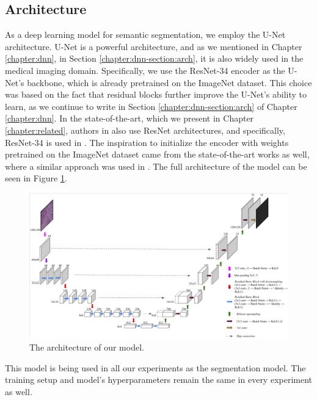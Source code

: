 \subsection{Architecture}
As a deep learning model for semantic segmentation, we employ the U-Net architecture. U-Net is a powerful architecture, and as we mentioned in Chapter \ref{chapter:dnn}, in Section \ref{chapter:dnn-section:arch}, it is also widely used in the medical imaging domain. Specifically, we use the ResNet-34 encoder as the U-Net's backbone, which is already pretrained on the ImageNet dataset. This choice was based on the fact that residual blocks further improve the U-Net's ability to learn, as we continue to write in Section \ref{chapter:dnn-section:arch} of Chapter \ref{chapter:dnn}. In the state-of-the-art, which we present in Chapter \ref{chapter:related}, authors in \cite{Zhang2022, Liang2023} also use ResNet architectures, and specifically, ResNet-34 is used in \cite{Lin2023}. The inspiration to initialize the encoder with weights pretrained on the ImageNet dataset came from the state-of-the-art works as well, where a similar approach was used in \cite{Zhang2022, Lin2023, Liang2023}. The full architecture of the model can be seen in Figure \ref{fig:our-architecture}.

\begin{figure}[H]
\begin{centering}
\includegraphics[width=\textwidth]{assets/images/for_presentation/our_architecture.png}
\par\end{centering}
\caption{The architecture of our model. 
\label{fig:our-architecture}}
\end{figure}

This model is being used in all our experiments as the segmentation model. The training setup and model's hyperparameters remain the same in every experiment as well. 

